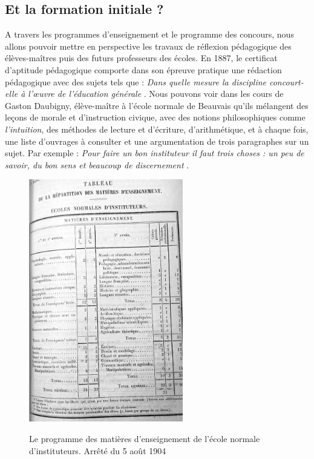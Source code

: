\documentclass[a4paper,11pt]{article}
\begin{document}
			\subsection{Et la formation initiale ?}
			A travers les programmes d'enseignement et le programme des concours, nous allons pouvoir mettre en perspective les travaux de réflexion pédagogique des élèves-maîtres puis des futurs professeurs des écoles. En 1887, le certificat d'aptitude pédagogique comporte dans son épreuve pratique une rédaction pédagogique avec des sujets tels que : \emph{Dans quelle mesure la discipline concourt-elle à l'œuvre de l'éducation générale} \cite{cha87}. Nous pouvons voir dans les cours de Gaston Daubigny, élève-maître à l'école normale de Beauvais qu'ils mélangent des leçons de morale et d'instruction civique, avec des notions philosophiques comme \emph{l'intuition}, des méthodes de lecture et d'écriture, d'arithmétique, et à chaque fois, une liste d'ouvrages à consulter et une argumentation de trois paragraphes sur un sujet. Par exemple : \emph{Pour faire un bon instituteur il faut trois choses : un peu de savoir, du bon sens et beaucoup de discernement} \cite{dob1899}. 
			\begin{figure}[!h]
			\centering
			\includegraphics[width=0.6\textwidth]{prog1905.png}\\
			\caption{Le programme des matières d'enseignement de l'école normale d'instituteurs. Arrêté du 5 août 1904}
			\label{fig. 1}
			\end{figure}
\end{document}
